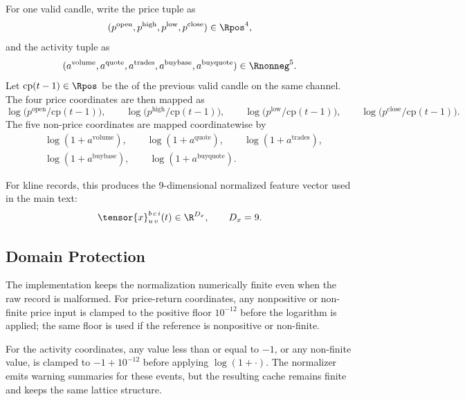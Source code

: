 For one valid candle, write the price tuple as
\[
  (p^{\mathrm{open}}, p^{\mathrm{high}}, p^{\mathrm{low}}, p^{\mathrm{close}})
  \in \Rpos^{4},
\]
and the activity tuple as
\[
  (a^{\mathrm{volume}}, a^{\mathrm{quote}}, a^{\mathrm{trades}},
   a^{\mathrm{buybase}}, a^{\mathrm{buyquote}})
  \in \Rnonneg^{5}.
\]
Let $\mathrm{cp}(t-1) \in \Rpos$ be the  of the previous
valid candle on the same channel.  The four price coordinates are then mapped
as
\[
  \log\!\bigl(p^{\mathrm{open}}/\mathrm{cp}(t-1)\bigr), \qquad
  \log\!\bigl(p^{\mathrm{high}}/\mathrm{cp}(t-1)\bigr), \qquad
  \log\!\bigl(p^{\mathrm{low}}/\mathrm{cp}(t-1)\bigr), \qquad
  \log\!\bigl(p^{\mathrm{close}}/\mathrm{cp}(t-1)\bigr).
\]
The five non-price coordinates are mapped coordinatewise by
\[
  \begin{aligned}
    &\log(1+a^{\mathrm{volume}}), \qquad
    \log(1+a^{\mathrm{quote}}), \qquad
    \log(1+a^{\mathrm{trades}}), \\
    &\log(1+a^{\mathrm{buybase}}), \qquad
    \log(1+a^{\mathrm{buyquote}}).
  \end{aligned}
\]

For kline records, this produces the 9-dimensional normalized feature vector
used in the main text:
\[
  \tensor{x}_{u\,v}^{b\,c\,i}(t) \in \R^{D_x},
  \qquad D_x = 9.
\]

\subsection{Domain Protection}
\label{appsub:domain-protection}

The implementation keeps the normalization numerically finite even when the raw
record is malformed.  For price-return coordinates, any nonpositive or
non-finite price input is clamped to the positive floor $10^{-12}$ before the
logarithm is applied; the same floor is used if the reference
 is nonpositive or non-finite.

For the activity coordinates, any value less than or equal to $-1$, or any
non-finite value, is clamped to $-1 + 10^{-12}$ before applying
$\log(1+\cdot)$.  The normalizer emits warning summaries for these events, but
the resulting cache remains finite and keeps the same lattice structure.
